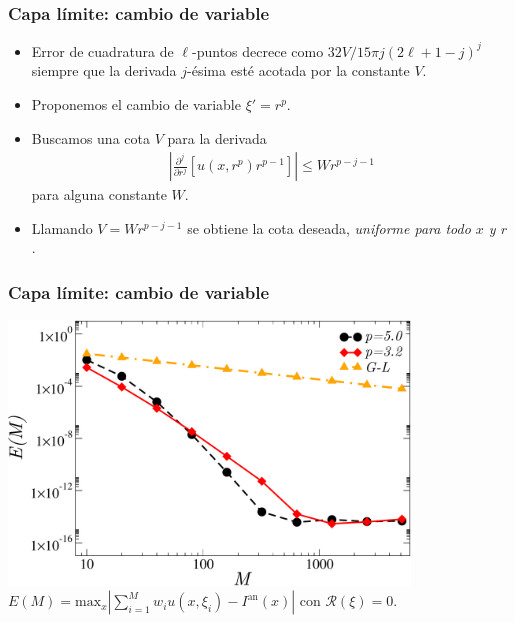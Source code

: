 
\begin{frame}
\frametitle{Capa límite: cambio de variable}

\begin{itemize}

\item Error de cuadratura de $\ell$-puntos 
decrece como $32V/15\pi j (2\ell+1-j)^j$ siempre que la derivada 
$j$-ésima esté acotada por la constante $V$. 

\item Proponemos el cambio de variable  $\xi'=r^p$.

\item Buscamos una cota $V$ 
para la derivada
\begin{equation*}
\begin{split}
\left | \frac{\partial^j }{\partial r^j}\left[ u(x,r^p) r^{p-1}\right]
\right|\leq W r^{p-j-1}
\end{split}
\end{equation*}
para alguna constante $W$. 

\item Llamando $V = W r^{p-j-1}$  
se obtiene la cota deseada, {\em uniforme 
para todo $x$ y $r$ }.

\end{itemize}


\end{frame}



\begin{frame}
\frametitle{Capa límite: cambio de variable}

\begin{center}
  \includegraphics[width=0.8\textwidth]{figuras/quads.pdf}\\

$E(M)=\text{max}_x |\sum_{i=1}^M w_i u(x,\xi_i)-I^{\text{an}}(x)|$ con $\mathcal{R}(\xi)=0$.
 \end{center}


\end{frame}

